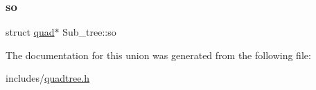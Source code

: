 \mbox{\label{unionSub__tree_a85d306e53fc4bae2f6509e444272125c}} 
\subsubsection{\texorpdfstring{so}{so}}
{\footnotesize\ttfamily struct \hyperlink{structquad}{quad}$\ast$ Sub\+\_\+tree\+::so}



The documentation for this union was generated from the following file\+:\begin{DoxyCompactItemize}
\item 
includes/\hyperlink{quadtree_8h}{quadtree.\+h}\end{DoxyCompactItemize}

